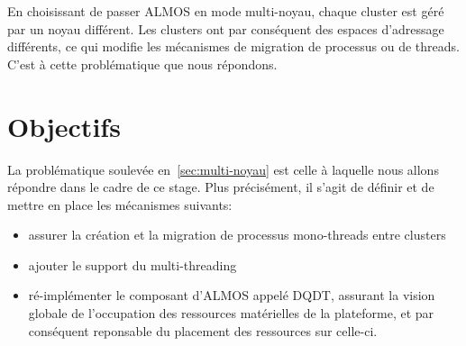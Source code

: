     En choisissant de passer ALMOS en mode multi-noyau, chaque cluster est géré
    par un noyau différent. Les clusters ont par conséquent des espaces
    d'adressage différents, ce qui modifie les mécanismes de migration de
    processus ou de threads. C'est à cette problématique que nous répondons.


  \section{Objectifs}

    La problématique soulevée en~\ref{sec:multi-noyau} est celle à laquelle nous
    allons répondre dans le cadre de ce stage. Plus précisément, il s'agit de
    définir et de mettre en place les mécanismes suivants:

    \begin{itemize}
      \item assurer la création et la migration de processus mono-threads entre
        clusters
      \item ajouter le support du multi-threading
      \item ré-implémenter le composant d'ALMOS appelé
        DQDT, assurant
        la vision globale de l'occupation des ressources matérielles de la
        plateforme, et par conséquent reponsable du placement des ressources sur
        celle-ci.
    \end{itemize}
